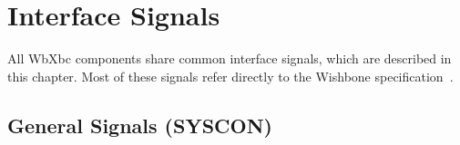 
\section{Interface Signals}
\label{sig}

All WbXbc components share common interface signals, which are described in this
chapter. Most of these signals refer directly to the Wishbone specification~\cite{wishbone}.

\subsection{General Signals (SYSCON)}

